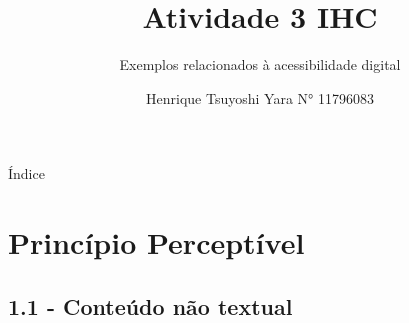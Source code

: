 \documentclass{beamer}
\title {Atividade 3 IHC}
\subtitle {Exemplos relacionados à acessibilidade digital}
\author {Henrique Tsuyoshi Yara N° 11796083}
\institute {USP - Universidade de São Paulo}
\begin{document}
\begin{frame}{\titlepage}
\end{frame}

\begin{frame}{Índice}
\begin{multicols}{2}
  \tableofcontents
\end{multicols}
\end{frame}

\section{Princípio Perceptível}
\subsection{1.1 - Conteúdo não textual}
\end{document}
